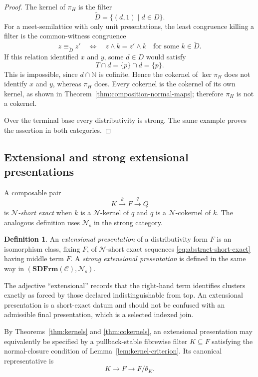 \documentclass[12pt,oneside,reqno]{amsart}
\theoremstyle{definition}
\newtheorem{definition}[theorem]{Definition}
\theoremstyle{remark}
\newcommand{\C}{\mathcal C}
\newcommand{\SDFrm}{\mathbf{SDFrm}}
\newcommand{\Null}{\mathcal N}
\begin{document}
\begin{proof}
The kernel of \(\pi_H\) is the filter
\[
                   \widetilde D=\{(d,1)\mid d\in D\}.
\]
For a meet-semilattice with only unit presentations, the least
congruence killing a filter is the common-witness congruence
\[
 z\equiv_{\widetilde D}z'
 \quad\Longleftrightarrow\quad
 z\wedge k=z'\wedge k
 \quad\text{for some }k\in\widetilde D .
\]
If this relation identified \(x\) and \(y\), some \(d\in D\) would
satisfy
\[
                         T\cap d=\{p\}\cap d=\{p\}.
\]
This is impossible, since \(d\cap\mathbb N\) is cofinite.  Hence the
cokernel of \(\ker\pi_H\) does not identify \(x\) and \(y\), whereas
\(\pi_H\) does.  Every cokernel is the cokernel of its own kernel, as
shown in Theorem~\ref{thm:composition-normal-maps}; therefore
\(\pi_H\) is not a cokernel.

Over the terminal base every distributivity is strong.  The same
example proves the assertion in both categories.
\end{proof}

\subsection{Extensional and strong extensional presentations}

A composable pair
\begin{equation}\label{eq:abstract-short-exact}
 K\xrightarrow{k}F\xrightarrow{q}Q
\end{equation}
is \emph{\(\Null\)-short exact} when \(k\) is a \(\Null\)-kernel of
\(q\) and \(q\) is a \(\Null\)-cokernel of \(k\).  The analogous
definition uses \(\Null_{\mathrm s}\) in the strong category.

\begin{definition}\label{def:extensional-presentation}
An \emph{extensional presentation} of a distributivity form \(F\) is an
isomorphism class, fixing \(F\), of \(\Null\)-short exact sequences
\eqref{eq:abstract-short-exact} having middle term \(F\).  A
\emph{strong extensional presentation} is defined in the same way in
\((\SDFrm(\C),\Null_{\mathrm s})\).
\end{definition}

The adjective ``extensional'' records that the right-hand term
identifies clusters exactly as forced by those declared indistinguishable
from top.  An extensional presentation is a short-exact datum and should
not be confused with an admissible final presentation, which is a
selected indexed join.

By Theorems~\ref{thm:kernels} and \ref{thm:cokernels}, an extensional
presentation may equivalently be specified by a pullback-stable
fibrewise filter \(K\subseteq F\) satisfying the normal-closure
condition of Lemma~\ref{lem:kernel-criterion}.  Its canonical
representative is
\[
 K\longrightarrow F\longrightarrow F/\theta_K.
\]
\end{document}
